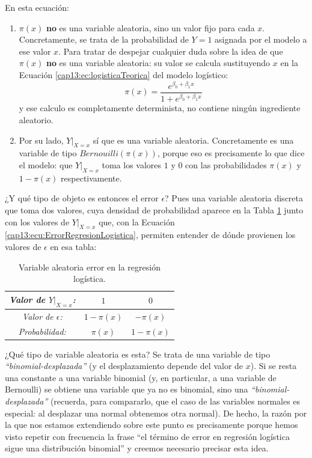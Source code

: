 En esta ecuación:
\begin{enumerate}
		\item $\pi(x)$ {\bf no} es una variable aleatoria, sino un valor fijo para cada $x$. Concretamente, se trata de la probabilidad de $Y=1$ asignada por el modelo a ese valor $x$. Para tratar de despejar cualquier duda sobre la idea de que $\pi(x)$ {\bf no} es una variable aleatoria:  su valor se calcula sustituyendo $x$ en la Ecuación \ref{cap13:ec:logisticaTeorica} del modelo logístico:
		\[\pi(x)=\dfrac{e^{\beta_0+\beta_1 x}}{1+e^{\beta_0+\beta_1 x}}\]
		y ese calculo es completamente determinista, no contiene ningún ingrediente aleatorio.

		\item  Por su lado, $Y|_{X=x}$ sí que es  una variable aleatoria.   Concretamente es una variable de tipo $Bernouilli(\pi(x))$, porque eso es precisamente lo que dice el modelo: que $Y|_{X=x}$ toma los valores $1$ y $0$ con las probabilidades $\pi(x)$ y $1 - \pi(x)$ respectivamente.
\end{enumerate}
¿Y qué tipo de objeto es entonces el error $\epsilon$? Pues una variable aleatoria discreta que toma dos valores, cuya densidad de probabilidad aparece en la Tabla \ref{cap13:tabla:VariableErrorRegresionLogistica} junto con los valores de $Y|_{X=x}$ que, con la Ecuación \ref{cap13:ecu:ErrorRegresionLogistica}, permiten entender de dónde provienen los valores de $\epsilon$ en esa tabla:
	\begin{table}[ht]
		\begin{center}
			\begin{tabular}[t]{|c|c|c|}
				\hline
				\rule{0cm}{0.5cm}{\em Valor de $Y|_{X=x}$:}&$1$&$0$\\
				\hline
				\rule{0cm}{0.5cm}{\em Valor de $\epsilon$:}&$1 - \pi(x)$&$-\pi(x)$\\
				\hline
				\rule{0cm}{0.7cm}{\em Probabilidad:}&$\pi(x)$&$1 -\pi(x)$\\
				\hline
			\end{tabular}
		\end{center}
		\caption{Variable aleatoria error en la regresión logística.}\label{cap13:tabla:VariableErrorRegresionLogistica}
	\end{table}
	¿Qué tipo de variable aleatoria es esta? Se trata de una variable de tipo  {\em ``binomial-desplazada''} (y el desplazamiento depende del valor de $x$).  Si se resta una constante a una variable binomial (y, en particular, a una variable de Bernoulli) se obtiene una variable que ya no es binomial, sino una {\em ``binomial-desplazada''} (recuerda, para compararlo, que el caso de las variables normales es especial: al desplazar una normal obtenemos otra normal). De hecho, la razón por la que nos estamos extendiendo sobre este punto es precisamente porque hemos visto repetir con frecuencia la frase ``el término de error en regresión logística sigue una distribución binomial''  y creemos necesario precisar esta idea.
	

